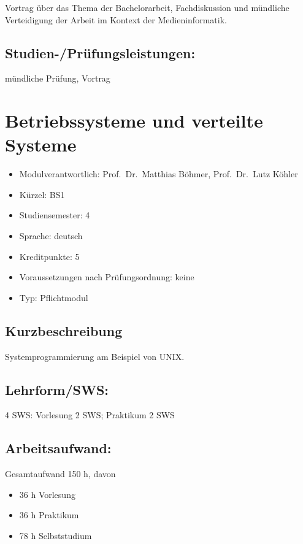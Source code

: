 Vortrag über das Thema der Bachelorarbeit, Fachdiskussion und mündliche
Verteidigung der Arbeit im Kontext der Medieninformatik.

\section*{Studien-/Prüfungsleistungen:}\label{studien-pruxfcfungsleistungen-3}

mündliche Prüfung, Vortrag

\chapter{Betriebssysteme und verteilte
Systeme}\label{betriebssysteme-und-verteilte-systeme}

\begin{itemize}
\tightlist
\item
  Modulverantwortlich: Prof.~Dr.~Matthias Böhmer, Prof.~Dr.~Lutz Köhler
\item
  Kürzel: BS1
\item
  Studiensemester: 4
\item
  Sprache: deutsch
\item
  Kreditpunkte: 5
\item
  Voraussetzungen nach Prüfungsordnung: keine
\item
  Typ: Pflichtmodul
\end{itemize}

\section*{Kurzbeschreibung}\label{kurzbeschreibung}

Systemprogrammierung am Beispiel von UNIX.

\section*{Lehrform/SWS:}\label{lehrformsws-5}

4 SWS: Vorlesung 2 SWS; Praktikum 2 SWS

\section*{Arbeitsaufwand:}\label{arbeitsaufwand-5}

Gesamtaufwand 150 h, davon

\begin{itemize}
\tightlist
\item
  36 h Vorlesung
\item
  36 h Praktikum
\item
  78 h Selbststudium
\end{itemize}

